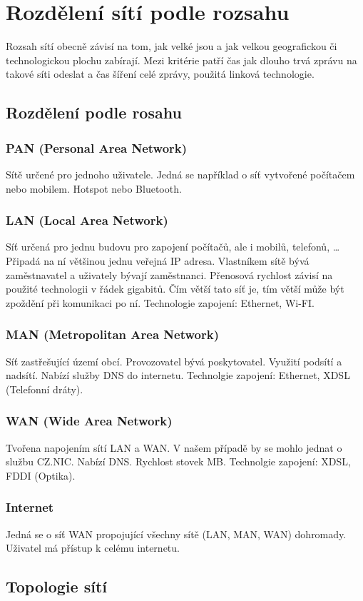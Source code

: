 \section{Rozdělení sítí podle rozsahu}
\label{sec:rozdeleni-siti}
Rozsah sítí obecně závisí na tom, jak velké jsou a jak velkou geografickou či technologickou plochu zabírají.
Mezi kritérie patří čas jak dlouho trvá zprávu na takové síti odeslat a čas šíření celé zprávy, použitá linková technologie.
\subsection{Rozdělení podle rosahu}
\subsubsection{PAN (Personal Area Network)}
Sítě určené pro jednoho uživatele.
Jedná se například o síť vytvořené počítačem nebo mobilem.
Hotspot nebo Bluetooth.
\subsubsection{LAN (Local Area Network)}
Síť určená pro jednu budovu pro zapojení počítačů, ale i mobilů, telefonů, \dots
Připadá na ní většinou jednu veřejná IP adresa.
Vlastníkem sítě bývá zaměstnavatel a uživately bývají zaměstnanci.
Přenosová rychlost závisí na použité technologii v řádek gigabitů.
Čím větší tato síť je, tím větší může být zpoždění při komunikaci po ní.
Technologie zapojení: Ethernet, Wi-FI.
\subsubsection{MAN (Metropolitan Area Network)}
Síť zastřešující území obcí.
Provozovatel bývá poskytovatel.
Využití podsítí a nadsítí.
Nabízí služby DNS do internetu.
Technolgie zapojení: Ethernet, XDSL (Telefonní dráty).
\subsubsection{WAN (Wide Area Network)}
Tvořena napojením sítí LAN a WAN.
V našem případě by se mohlo jednat o službu CZ.NIC.
Nabízí DNS.
Rychlost stovek MB.
Technolgie zapojení: XDSL, FDDI (Optika).
\subsubsection{Internet}
Jedná se o síť WAN propojující všechny sítě (LAN, MAN, WAN) dohromady.
Uživatel má přístup k celému internetu.
\subsection{Topologie sítí}
